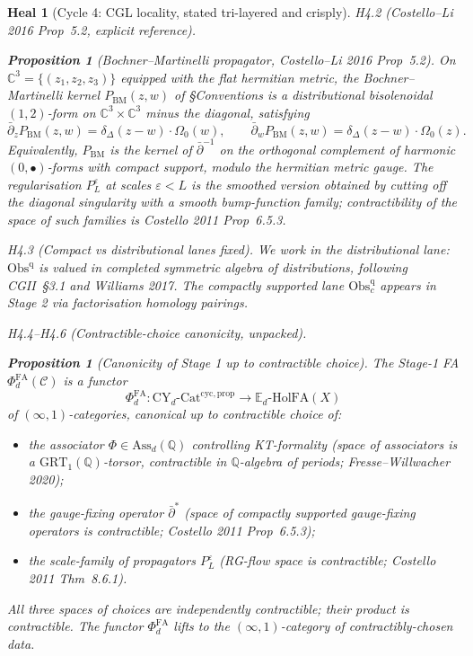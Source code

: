 \documentclass[11pt]{article}
\newtheorem{proposition}[theorem]{Proposition}
\newtheorem*{heal}{Heal}
\theoremstyle{definition}
\providecommand{\CC}{\mathbb{C}}
\providecommand{\QQ}{\mathbb{Q}}
\providecommand{\cC}{\mathcal{C}}
\providecommand{\Obs}{\mathrm{Obs}}
\providecommand{\BM}{\mathrm{BM}}
\providecommand{\FA}{\mathrm{FA}}
\providecommand{\HolFA}{\mathrm{HolFA}}
\begin{document}
\begin{heal}[Cycle 4: CGL locality, stated tri-layered and crisply]
\emph{H4.2 (Costello--Li 2016 Prop~5.2, explicit reference).}

\begin{proposition}[Bochner--Martinelli propagator, Costello--Li 2016
Prop~5.2]
\label{prop:bm-propagator}
On $\CC^3 = \{(z_1, z_2, z_3)\}$ equipped with the flat hermitian
metric, the Bochner--Martinelli kernel $P_{\BM}(z, w)$ of
\S\emph{Conventions} is a distributional bisolenoidal $(1,2)$-form on
$\CC^3 \times \CC^3$ minus the diagonal, satisfying
\[
  \bar\partial_z P_{\BM}(z, w) = \delta_\Delta(z - w) \cdot \Omega_0(w),
  \qquad
  \bar\partial_w P_{\BM}(z, w) = \delta_\Delta(z - w) \cdot \Omega_0(z).
\]
Equivalently, $P_{\BM}$ is the kernel of $\bar\partial^{-1}$ on the
orthogonal complement of harmonic $(0,\bullet)$-forms with compact
support, modulo the hermitian metric gauge. The regularisation
$P_L^\varepsilon$ at scales $\varepsilon < L$ is the smoothed version
obtained by cutting off the diagonal singularity with a smooth
bump-function family; contractibility of the space of such families
is Costello 2011 Prop~6.5.3.
\end{proposition}

\emph{H4.3 (Compact vs distributional lanes fixed).} We work in the
distributional lane: $\Obs^{\mathrm{q}}$ is valued in completed
symmetric algebra of distributions, following CGII~\S3.1 and Williams
2017. The compactly supported lane $\Obs^{\mathrm{q}}_c$ appears in
Stage 2 via factorisation homology pairings.

\emph{H4.4--H4.6 (Contractible-choice canonicity, unpacked).}

\begin{proposition}[Canonicity of Stage 1 up to contractible choice]
\label{prop:canonicity-stage1}
The Stage-1 FA $\Phi^{\FA}_d(\cC)$ is a functor
\[
  \Phi^{\FA}_d\colon \mathrm{CY}_d\text{-Cat}^{\mathrm{cyc},\mathrm{prop}}
  \longrightarrow \mathbb{E}_d\text{-}\HolFA(X)
\]
of $(\infty,1)$-categories, canonical up to contractible choice of:
\begin{itemize}[leftmargin=2em]
  \item the associator $\Phi \in \mathrm{Ass}_d(\QQ)$ controlling
        KT-formality (space of associators is a $\mathrm{GRT}_1(\QQ)$-torsor,
        contractible in $\QQ$-algebra of periods; Fresse--Willwacher 2020);
  \item the gauge-fixing operator $\bar\partial^*$ (space of
        compactly supported gauge-fixing operators is contractible;
        Costello 2011 Prop~6.5.3);
  \item the scale-family of propagators $P_L^\varepsilon$
        (RG-flow space is contractible; Costello 2011 Thm~8.6.1).
\end{itemize}
All three spaces of choices are independently contractible; their
product is contractible. The functor $\Phi^{\FA}_d$ lifts to the
$(\infty,1)$-category of contractibly-chosen data.
\end{proposition}
\end{heal}
\end{document}
